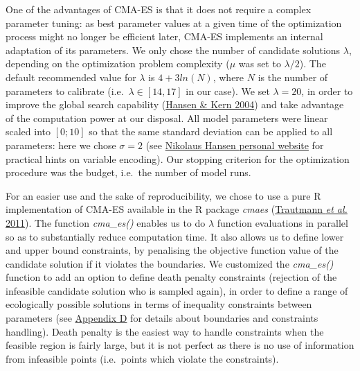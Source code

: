 \documentclass[11pt,]{article}
\begin{document}
One of the advantages of CMA-ES is that it does not require a complex
parameter tuning: as best parameter values at a given time of the
optimization process might no longer be efficient later, CMA-ES
implements an internal adaptation of its parameters. We only chose the
number of candidate solutions \(\lambda\), depending on the optimization
problem complexity (\(\mu\) was set to \(\lambda/2\)). The default
recommended value for \(\lambda\) is \(4 + 3 ln(N)\), where \(N\) is the
number of parameters to calibrate (i.e.~\(\lambda \in [14,17]\) in our
case). We set \(\lambda = 20\), in order to improve the global search
capability (\protect\hyperlink{ref-Hansen2004}{Hansen \& Kern 2004}) and
take advantage of the computation power at our disposal. All model
parameters were linear scaled into \([0;10]\) so that the same standard
deviation can be applied to all parameters: here we chose \(\sigma = 2\)
(see
\href{https://cma-es.github.io/cmaes_sourcecode_page.html\#practical}{Nikolaus
Hansen personal website} for practical hints on variable encoding). Our
stopping criterion for the optimization procedure was the budget,
i.e.~the number of model runs.

For an easier use and the sake of reproducibility, we chose to use a
pure R implementation of CMA-ES available in the R package \emph{cmaes}
(\protect\hyperlink{ref-Trautmann2011}{Trautmann \emph{et al.} 2011}).
The function \emph{cma\_es()} enables us to do \(\lambda\) function
evaluations in parallel so as to substantially reduce computation time.
It also allows us to define lower and upper bound constraints, by
penalising the objective function value of the candidate solution if it
violates the boundaries. We customized the \emph{cma\_es()} function to
add an option to define death penalty constraints (rejection of the
infeasible candidate solution who is sampled again), in order to define
a range of ecologically possible solutions in terms of inequality
constraints between parameters (see
\protect\hyperlink{appendixD}{Appendix D} for details about boundaries
and constraints handling). Death penalty is the easiest way to handle
constraints when the feasible region is fairly large, but it is not
perfect as there is no use of information from infeasible points
(i.e.~points which violate the constraints).
\end{document}
